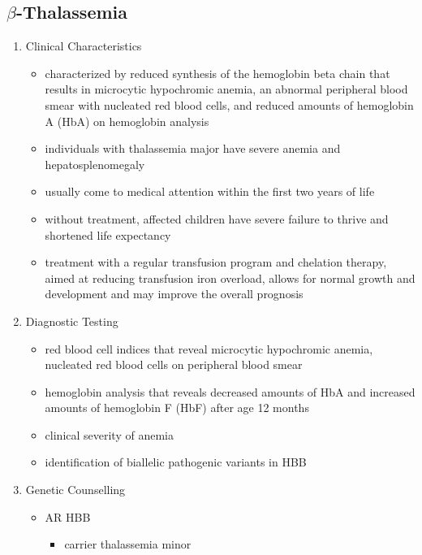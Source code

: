 \documentclass[12pt]{scrartcl}
\begin{document}
\subsection{\(\beta\)-Thalassemia}
\label{sec:orgb0d1f68}
\begin{enumerate}
\item Clinical Characteristics
\label{sec:orge1c3673}
\begin{itemize}
\item characterized by reduced synthesis of the hemoglobin beta chain that
results in microcytic hypochromic anemia, an abnormal peripheral
blood smear with nucleated red blood cells, and reduced amounts of
hemoglobin A (HbA) on hemoglobin analysis
\item individuals with thalassemia major have severe anemia and
hepatosplenomegaly
\item usually come to medical attention within the first two years of
life
\item without treatment, affected children have severe failure to thrive
and shortened life expectancy
\item treatment with a regular transfusion program and chelation therapy,
aimed at reducing transfusion iron overload, allows for normal
growth and development and may improve the overall prognosis
\end{itemize}
\item Diagnostic Testing
\label{sec:org52ada3d}
\begin{itemize}
\item red blood cell indices that reveal microcytic hypochromic anemia,
nucleated red blood cells on peripheral blood smear
\item hemoglobin analysis that reveals decreased amounts of HbA and
increased amounts of hemoglobin F (HbF) after age 12 months
\item clinical severity of anemia
\item identification of biallelic pathogenic variants in HBB
\end{itemize}
\item Genetic Counselling
\label{sec:orgf9df0fa}
\begin{itemize}
\item AR HBB
\begin{itemize}
\item carrier thalassemia minor
\end{itemize}
\end{itemize}
\end{enumerate}
\end{document}
